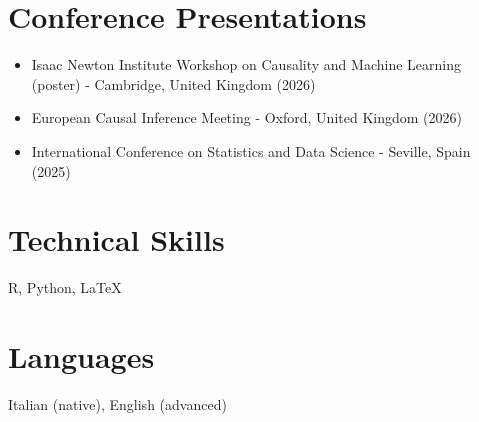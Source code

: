 \documentclass[11pt]{article}
\begin{document}
\section*{Conference Presentations}
\begin{itemize}
  \item Isaac Newton Institute Workshop on Causality and Machine Learning (poster) - Cambridge, United Kingdom (2026)
\end{itemize}
\begin{itemize}
  \item European Causal Inference Meeting - Oxford, United Kingdom (2026)
\end{itemize}
\begin{itemize}
  \item International Conference on Statistics and Data Science - Seville, Spain (2025)
\end{itemize}

\section*{Technical Skills}
R, Python, \LaTeX

\section*{Languages}
Italian (native), English (advanced)
\end{document}
